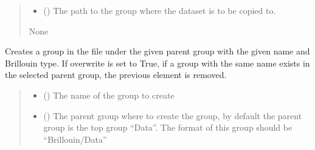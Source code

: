 \documentclass[letterpaper,10pt,english]{sphinxmanual}
\begin{document}
\begin{fulllineitems}
\begin{fulllineitems}
\begin{quote}
\begin{description}
\begin{itemize}
\item {} 
\sphinxAtStartPar
{} () \textendash{} The path to the group where the dataset is to be copied to.

\end{itemize}

\sphinxAtStartPar
None

\end{description}\end{quote}

\end{fulllineitems}


\begin{fulllineitems}
\label{\detokenize{_autosummary/HDF5_BLS.wrapper:HDF5_BLS.wrapper.Wrapper.create_group}}
\pysigstartsignatures
\pysiglinewithargsret
{}
{\sphinxparamcomma {}\sphinxparamcomma {}\sphinxparamcomma {}}
{}
\pysigstopsignatures
\sphinxAtStartPar
Creates a group in the file under the given parent group with the given name and Brillouin type. If overwrite is set to True, if a group with the same name exists in the selected parent group, the previous element is removed.
\begin{quote}\begin{description}
\begin{itemize}
\item {} 
\sphinxAtStartPar
{} () \textendash{} The name of the group to create

\item {} 
\sphinxAtStartPar
{} (\sphinxstyleliteralemphasis{\sphinxupquote{, }}) \textendash{} The parent group where to create the group, by default the parent group is the top group “Data”. The format of this group should be “Brillouin/Data”


\end{itemize}
\end{description}
\end{quote}
\end{fulllineitems}
\end{fulllineitems}
\end{document}
